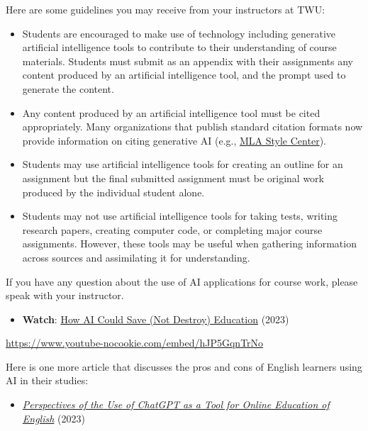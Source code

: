 \documentclass[
  letterpaper,
  DIV=11,
  numbers=noendperiod]{scrreprt}
\providecommand{\tightlist}{%
  \setlength{\itemsep}{0pt}\setlength{\parskip}{0pt}}\usepackage{longtable,booktabs,array}
\begin{document}
\begin{tcolorbox}
Here are some guidelines you may receive from your instructors at TWU:

\begin{itemize}
\tightlist
\item
  Students are encouraged to make use of technology including generative
  artificial intelligence tools to contribute to their understanding of
  course materials. Students must submit as an appendix with their
  assignments any content produced by an artificial intelligence tool,
  and the prompt used to generate the content.
\item
  Any content produced by an artificial intelligence tool must be cited
  appropriately. Many organizations that publish standard citation
  formats now provide information on citing generative AI (e.g.,
  \href{https://style.mla.org/citing-generative-ai/}{MLA Style Center}).
\item
  Students may use artificial intelligence tools for creating an outline
  for an assignment but the final submitted assignment must be original
  work produced by the individual student alone.
\item
  Students may not use artificial intelligence tools for taking tests,
  writing research papers, creating computer code, or completing major
  course assignments. However, these tools may be useful when gathering
  information across sources and assimilating it for understanding.
\end{itemize}

If you have any question about the use of AI applications for course
work, please speak with your instructor.

\begin{itemize}
\tightlist
\item
  \textbf{Watch}: \href{https://www.youtube.com/watch?v=hJP5GqnTrNo}{How
  AI Could Save (Not Destroy) Education} (2023)
\end{itemize}

\url{https://www.youtube-nocookie.com/embed/hJP5GqnTrNo}

Here is one more article that discusses the pros and cons of English
learners using AI in their studies:

\begin{itemize}
\tightlist
\item
  \href{https://www.researchgate.net/publication/374483468_Perspectives_of_the_Use_of_ChatGPT_as_a_Tool_for_Online_Education_of_English}{\emph{Perspectives
  of the Use of ChatGPT as a Tool for Online Education of English}}
  (2023)
\end{itemize}

\end{tcolorbox}
\end{document}
